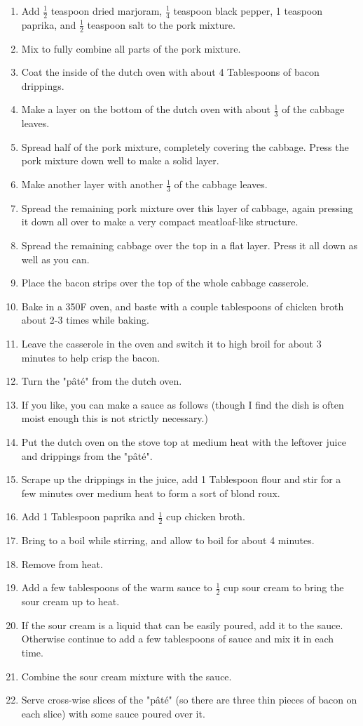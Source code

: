 \begin{multicols}{2}
\begin{enumerate}
    \item Add \( \frac{1}{2} \) teaspoon dried marjoram, \( \frac{1}{4} \) teaspoon black pepper, 1 teaspoon paprika, and \( \frac{1}{2} \) teaspoon salt to the pork mixture.
    \item Mix to fully combine all parts of the pork mixture.
    \item Coat the inside of the dutch oven with about 4 Tablespoons of bacon drippings.
    \item Make a layer on the bottom of the dutch oven with about \( \frac{1}{3} \) of the cabbage leaves.
    \item Spread half of the pork mixture, completely covering the cabbage. Press the pork mixture down well to make a solid layer.
    \item Make another layer with another \( \frac{1}{3} \) of the cabbage leaves.
    \item Spread the remaining pork mixture over this layer of cabbage, again pressing it down all over to make a very compact meatloaf-like structure.
    \item Spread the remaining cabbage over the top in a flat layer. Press it all down as well as you can.
    \item Place the bacon strips over the top of the whole cabbage casserole.
    \item Bake in a 350F oven, and baste with a couple tablespoons of chicken broth about 2-3 times while baking.
    \item Leave the casserole in the oven and switch it to high broil for about 3 minutes to help crisp the bacon.
    \item Turn the "pâté" from the dutch oven.
    \item If you like, you can make a sauce as follows (though I find the dish is often moist enough this is not strictly necessary.)
    \item Put the dutch oven on the stove top at medium heat with the leftover juice and drippings from the "pâté".
    \item Scrape up the drippings in the juice, add 1 Tablespoon flour and stir for a few minutes over medium heat to form a sort of blond roux.
    \item Add 1 Tablespoon paprika and \( \frac{1}{2} \) cup chicken broth.
    \item Bring to a boil while stirring, and allow to boil for about 4 minutes.
    \item Remove from heat.
    \item Add a few tablespoons of the warm sauce to \( \frac{1}{2} \) cup sour cream to bring the sour cream up to heat.
    \item If the sour cream is a liquid that can be easily poured, add it to the sauce. Otherwise continue to add a few tablespoons of sauce and mix it in each time.
    \item Combine the sour cream mixture with the sauce.
    \item Serve cross-wise slices of the "pâté" (so there are three thin pieces of bacon on each slice) with some sauce poured over it.


\end{enumerate}
\end{multicols}
